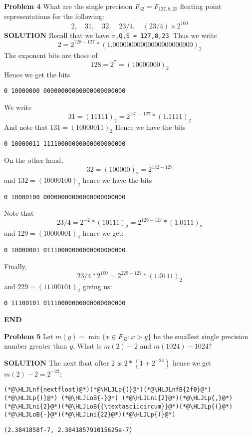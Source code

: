 \documentclass[12pt,a4paper]{article}
\newcommand{\HLJLnf}[1]{\textcolor[RGB]{66,102,213}{#1}}
\newcommand{\HLJLnfB}[1]{\textcolor[RGB]{59,151,46}{#1}}
\newcommand{\HLJLni}[1]{\textcolor[RGB]{59,151,46}{#1}}
\newcommand{\HLJLoB}[1]{\textcolor[RGB]{102,102,102}{\textbf{#1}}}
\newcommand{\HLJLp}[1]{#1}
\begin{document}
\textbf{Problem 4} What are the single precision $F_{32} = F_{127,8,23}$ floating point representations for the following: 
\[
2, \quad 31, \quad 32, \quad 23/4, \quad (23/4)\times 2^{100}
\]
\textbf{SOLUTION} Recall that we have \texttt{\ensuremath{\sigma},Q,S = 127,8,23}. Thus we write
\[
2 = 2^{128-127} * (1.00000000000000000000000)_2
\]
The exponent bits are those of
\[
128 = 2^7 = (10000000)_2
\]
Hence we get the bits 

\begin{verbatim}
0 10000000 00000000000000000000000
\end{verbatim}
We write
\[
31 = (11111)_2 = 2^{131-127} * (1.1111)_2
\]
And note that $131 = (10000011)_2$ Hence we have the bits

\begin{verbatim}
0 10000011 11110000000000000000000
\end{verbatim}
On the other hand,
\[
32 = (100000)_2 = 2^{132-127}
\]
and $132 = (10000100)_2$ hence we have the bits 

\begin{verbatim}
0 10000100 00000000000000000000000
\end{verbatim}
Note that
\[
23/4 = 2^{-2} * (10111)_2 = 2^{129-127} * (1.0111)_2
\]
and $129 = (10000001)_2$ hence we get:

\begin{verbatim}
0 10000001 01110000000000000000000
\end{verbatim}
Finally,
\[
23/4 * 2^{100} = 2^{229-127} * (1.0111)_2
\]
and $229 = (11100101)_2$ giving us:

\begin{verbatim}
0 11100101 01110000000000000000000
\end{verbatim}
\textbf{END}

\textbf{Problem 5} Let $m(y) = \min\{x \in F_{32} : x > y \}$ be the smallest single precision number greater than $y$. What is $m(2) - 2$ and $m(1024) - 1024$? 

\textbf{SOLUTION} The next float after $2$ is $2 * (1 + 2^{-23})$ hence we get $m(2) - 2 = 2^{-22}$:


\begin{lstlisting}
(*@\HLJLnf{nextfloat}@*)(*@\HLJLp{(}@*)(*@\HLJLnfB{2f0}@*)(*@\HLJLp{)}@*) (*@\HLJLoB{-}@*) (*@\HLJLni{2}@*)(*@\HLJLp{,}@*) (*@\HLJLni{2}@*)(*@\HLJLoB{{\textasciicircum}}@*)(*@\HLJLp{(}@*)(*@\HLJLoB{-}@*)(*@\HLJLni{22}@*)(*@\HLJLp{)}@*)
\end{lstlisting}

\begin{lstlisting}
(2.3841858f-7, 2.384185791015625e-7)
\end{lstlisting}
\end{document}

